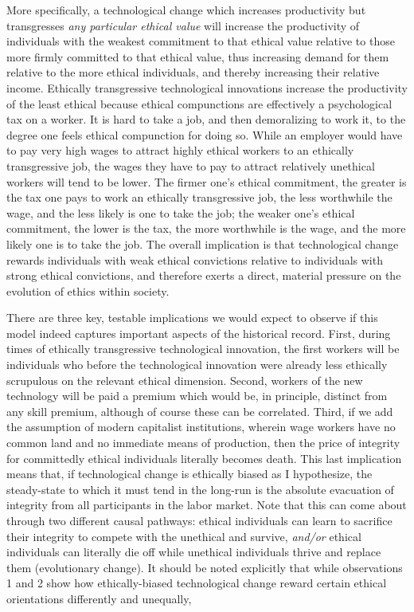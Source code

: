 \documentclass[a4paper,12pt,margin=.5in]{article}
\begin{document}
More specifically, a technological change which increases productivity
but transgresses \emph{any particular ethical value} will increase the
productivity of individuals with the weakest commitment to that ethical
value relative to those more firmly committed to that ethical value,
thus increasing demand for them relative to the more ethical
individuals, and thereby increasing their relative income. Ethically
transgressive technological innovations increase the productivity of the
least ethical because ethical compunctions are effectively a
psychological tax on a worker. It is hard to take a job, and then
demoralizing to work it, to the degree one feels ethical compunction for
doing so. While an employer would have to pay very high wages to attract
highly ethical workers to an ethically transgressive job, the wages they
have to pay to attract relatively unethical workers will tend to be
lower. The firmer one's ethical commitment, the greater is the tax one
pays to work an ethically transgressive job, the less worthwhile the
wage, and the less likely is one to take the job; the weaker one's
ethical commitment, the lower is the tax, the more worthwhile is the
wage, and the more likely one is to take the job. The overall
implication is that technological change rewards individuals with weak
ethical convictions relative to individuals with strong ethical
convictions, and therefore exerts a direct, material pressure on the
evolution of ethics within society.

There are three key, testable implications we would expect to observe if
this model indeed captures important aspects of the historical record.
First, during times of ethically transgressive technological innovation,
the first workers will be individuals who before the technological
innovation were already less ethically scrupulous on the relevant
ethical dimension. Second, workers of the new technology will be paid a
premium which would be, in principle, distinct from any skill premium,
although of course these can be correlated. Third, if we add the
assumption of modern capitalist institutions, wherein wage workers have
no common land and no immediate means of production, then the price of
integrity for committedly ethical individuals literally becomes death.
This last implication means that, if technological change is ethically
biased as I hypothesize, the steady-state to which it must tend in the
long-run is the absolute evacuation of integrity from all participants
in the labor market. Note that this can come about through two different
causal pathways: ethical individuals can learn to sacrifice their
integrity to compete with the unethical and survive, \emph{and/or}
ethical individuals can literally die off while unethical individuals
thrive and replace them (evolutionary change). It should be noted
explicitly that while observations 1 and 2 show how ethically-biased
technological change reward certain ethical orientations differently and
unequally,
\end{document}
